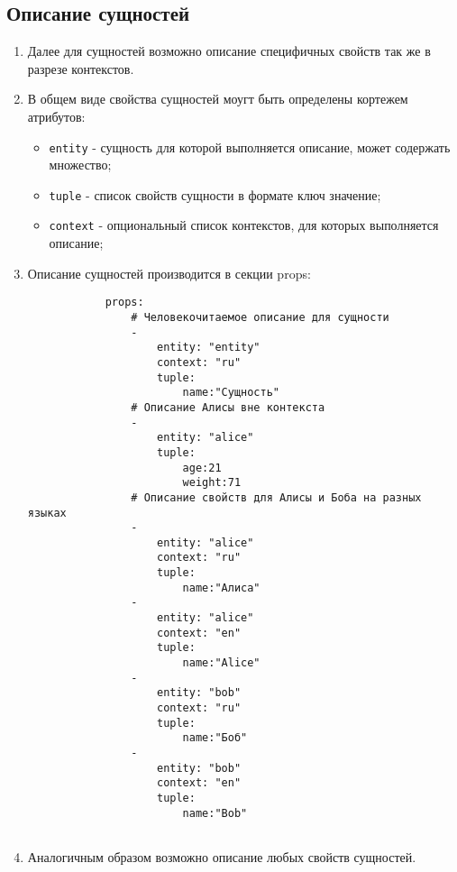 \documentclass[final]{article}
\begin{document}
    \subsection{Описание сущностей}
        \begin{enumerate}

            \item Далее для сущностей возможно описание специфичных свойств
            так же в разрезе контекстов.

            \item В общем виде свойства сущностей моугт быть определены кортежем 
            атрибутов:

            \begin{itemize}
                \item \texttt{entity} - сущность для которой выполняется 
                описание, может содержать множество;
                \item \texttt{tuple} - список свойств сущности в 
                формате ключ значение;
                \item \texttt{context} - опциональный список контекстов, для 
                которых выполняется описание;
            \end{itemize}
        

            \item Описание сущностей производится в секции props:          
            \begin{verbatim}
            props:
                # Человекочитаемое описание для сущности
                -
                    entity: "entity"
                    context: "ru"
                    tuple: 
                        name:"Сущность"
                # Описание Алисы вне контекста
                -
                    entity: "alice"
                    tuple: 
                        age:21
                        weight:71
                # Описание свойств для Алисы и Боба на разных языках
                -
                    entity: "alice"
                    context: "ru"
                    tuple: 
                        name:"Алиса"
                -
                    entity: "alice"
                    context: "en"
                    tuple: 
                        name:"Alice"
                -
                    entity: "bob"
                    context: "ru"
                    tuple: 
                        name:"Боб"
                -
                    entity: "bob"
                    context: "en"
                    tuple: 
                        name:"Bob"
            
            \end{verbatim}

            \item Аналогичным образом возможно описание любых свойств сущностей.

        \end{enumerate}
        
\end{document}
